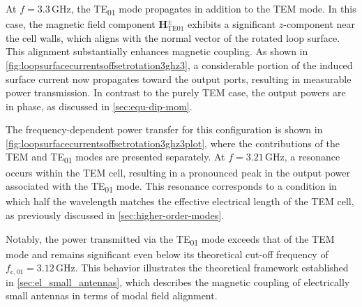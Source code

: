 At $f=3.3\,\mathrm{GHz}$, the TE\textsubscript{01} mode propagates in addition to the TEM mode. In this case, the magnetic field component $\mathbf{H}_\mathrm{TE01}^\pm$ exhibits a significant $z$-component near the cell walls, which aligns with the normal vector of the rotated loop surface. This alignment substantially enhances magnetic coupling. As shown in \autoref{fig:loopsurfacecurrentsoffsetrotation3ghz3}, a considerable portion of the induced surface current now propagates toward the output ports, resulting in measurable power transmission. In contrast to the purely TEM case, the output powers are in phase, as discussed in \cref{sec:equ-dip-mom}.

The frequency-dependent power transfer for this configuration is shown in \autoref{fig:loopsurfacecurrentsoffsetrotation3ghz3plot}, where the contributions of the TEM and TE\textsubscript{01} modes are presented separately. At $f=3.21\,\mathrm{GHz}$, a resonance occurs within the TEM cell, resulting in a pronounced peak in the output power associated with the TE\textsubscript{01} mode. This resonance corresponds to a condition in which half the wavelength matches the effective electrical length of the TEM cell, as previously discussed in \cref{sec:higher-order-modes}.

Notably, the power transmitted via the TE\textsubscript{01} mode exceeds that of the TEM mode and remains significant even below its theoretical cut-off frequency of $f_{\mathrm{c,01}}=3.12\,\mathrm{GHz}$. This behavior illustrates the theoretical framework established in \cref{sec:el_small_antennas}, which describes the magnetic coupling of electrically small antennas in terms of modal field alignment.

